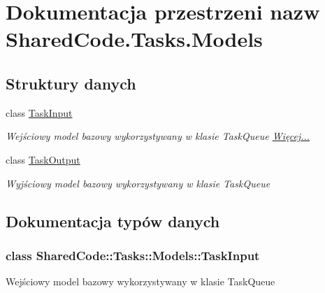 \hypertarget{a00066}{}\section{Dokumentacja przestrzeni nazw Shared\+Code.\+Tasks.\+Models}
\label{a00066}
\subsection*{Struktury danych}
\begin{DoxyCompactItemize}
\item 
class \hyperlink{a00066_de/dd7/a00362}{Task\+Input}
\begin{DoxyCompactList}\small\item\em Wejściowy model bazowy wykorzystywany w klasie Task\+Queue  \hyperlink{a00066_de/dd7/a00362}{Więcej...}\end{DoxyCompactList}\item 
class \hyperlink{a00067}{Task\+Output}
\begin{DoxyCompactList}\small\item\em Wyjściowy model bazowy wykorzystywany w klasie Task\+Queue \end{DoxyCompactList}\end{DoxyCompactItemize}


\subsection{Dokumentacja typów danych}
\label{a00362}
\hypertarget{a00066_a00362}{}
\subsubsection{class Shared\+Code\+:\+:Tasks\+:\+:Models\+:\+:Task\+Input}
Wejściowy model bazowy wykorzystywany w klasie Task\+Queue 

